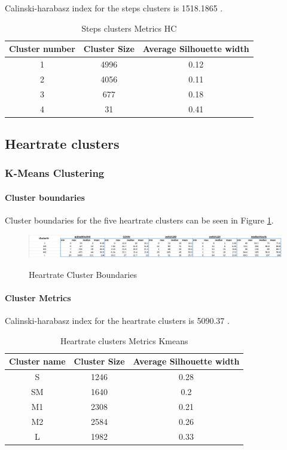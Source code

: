 \documentclass{article}
\begin{document}
Calinski-harabasz index for the steps clusters is 1518.1865 .

\begin{table}[H]
  \caption{Steps clusters Metrics HC}
  \label{steps_metrics}
  \centering
  \begin{tabular}{ c|c|c}
    \toprule
    \cmidrule(r){1-2}
    Cluster number & Cluster Size & Average Silhouette width \\
    \midrule
    1 & 4996 & 0.12 \\
    2 & 4056 & 0.11 \\
    3 & 677 & 0.18 \\
    4 & 31 & 0.41 \\
    \bottomrule
    \end{tabular}
\end{table}

\subsection{Heartrate clusters}

\subsubsection{K-Means Clustering}
\paragraph{Cluster boundaries}
Cluster boundaries for the five heartrate clusters can be seen in Figure \ref{fig:hrBoundaries}.

\begin{figure}[H]
  \centering
  \caption{Heartrate Cluster Boundaries}
  \includegraphics[scale=0.5]{hr_cluster_boundaries.png}
  \label{fig:hrBoundaries}
\end{figure}

\paragraph{Cluster Metrics}
Calinski-harabasz index for the heartrate clusters is 5090.37 .

\begin{table}[H]
  \caption{Heartrate clusters Metrics Kmeans}
  \label{hr_metrics}
  \centering
  \begin{tabular}{ c|c|c}
    \toprule
    \cmidrule(r){1-2}
    Cluster name & Cluster Size & Average Silhouette width \\
    \midrule
    S & 1246 & 0.28 \\
    SM & 1640 & 0.2 \\
    M1 & 2308 & 0.21 \\
    M2 & 2584 & 0.26 \\
    L & 1982 & 0.33 \\
    \bottomrule
    \end{tabular}
\end{table}
\end{document}

